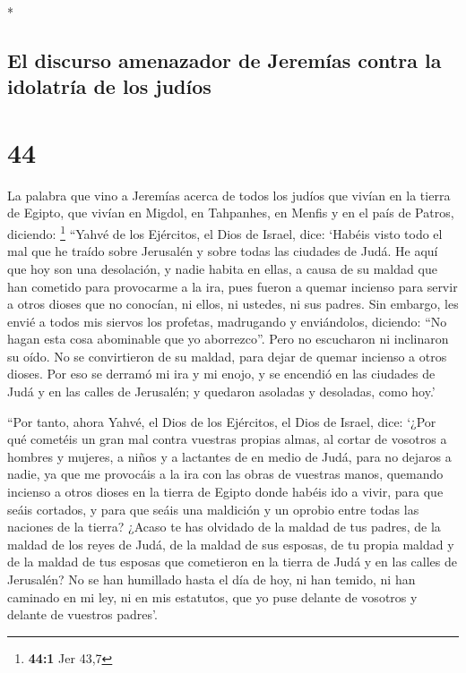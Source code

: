 \begin{paracol}{2}
\begin{otherlanguage}{english}
\end{otherlanguage}

\switchcolumn[0]*

\hypertarget{el-discurso-amenazador-de-jeremuxedas-contra-la-idolatruxeda-de-los-juduxedos}{%
\subsection{El discurso amenazador de Jeremías contra la idolatría de
los
judíos}\label{el-discurso-amenazador-de-jeremuxedas-contra-la-idolatruxeda-de-los-juduxedos}}

\hypertarget{section-86}{%
\section{44}\label{section-86}}

 La palabra que vino a Jeremías acerca de todos los judíos
que vivían en la tierra de Egipto, que vivían en Migdol, en Tahpanhes,
en Menfis y en el país de Patros, diciendo: \footnote{\textbf{44:1} Jer
  43,7}  ``Yahvé de los Ejércitos, el Dios de Israel,
dice: `Habéis visto todo el mal que he traído sobre Jerusalén y sobre
todas las ciudades de Judá. He aquí que hoy son una desolación, y nadie
habita en ellas,  a causa de su maldad que han cometido
para provocarme a la ira, pues fueron a quemar incienso para servir a
otros dioses que no conocían, ni ellos, ni ustedes, ni sus padres.
 Sin embargo, les envié a todos mis siervos los profetas,
madrugando y enviándolos, diciendo: ``No hagan esta cosa abominable que
yo aborrezco''.  Pero no escucharon ni inclinaron su oído.
No se convirtieron de su maldad, para dejar de quemar incienso a otros
dioses.  Por eso se derramó mi ira y mi enojo, y se
encendió en las ciudades de Judá y en las calles de Jerusalén; y
quedaron asoladas y desoladas, como hoy.'

 ``Por tanto, ahora Yahvé, el Dios de los Ejércitos, el
Dios de Israel, dice: `¿Por qué cometéis un gran mal contra vuestras
propias almas, al cortar de vosotros a hombres y mujeres, a niños y a
lactantes de en medio de Judá, para no dejaros a nadie, 
ya que me provocáis a la ira con las obras de vuestras manos, quemando
incienso a otros dioses en la tierra de Egipto donde habéis ido a vivir,
para que seáis cortados, y para que seáis una maldición y un oprobio
entre todas las naciones de la tierra?  ¿Acaso te has
olvidado de la maldad de tus padres, de la maldad de los reyes de Judá,
de la maldad de sus esposas, de tu propia maldad y de la maldad de tus
esposas que cometieron en la tierra de Judá y en las calles de
Jerusalén?  No se han humillado hasta el día de hoy, ni
han temido, ni han caminado en mi ley, ni en mis estatutos, que yo puse
delante de vosotros y delante de vuestros padres'.


\end{paracol}

